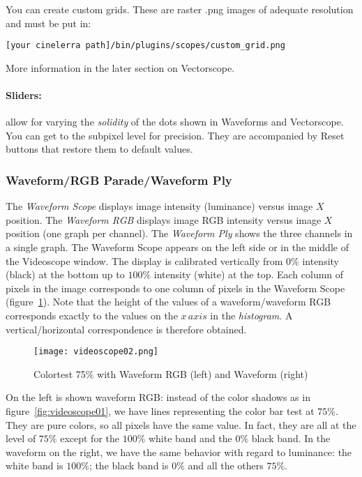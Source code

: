 You can create custom grids. These are raster .png images of adequate resolution and must be put in:

\begin{lstlisting}[style=sh]
[your cinelerra path]/bin/plugins/scopes/custom_grid.png
\end{lstlisting}

More information in the later section on Vectorscope.

\paragraph*{Sliders:} allow for varying the \textit{solidity} of the dots shown in Waveforms and Vectorscope. You can get to the subpixel level for precision. They are accompanied by Reset buttons that restore them to default values.



\subsubsection*{Waveform/RGB Parade/Waveform Ply}%
\label{ssub:waveform_rgb_parade_ply}

The \textit{Waveform Scope} displays image intensity (luminance) versus image $X$ position. The \textit{Waveform RGB} displays image RGB intensity versus image $X$ position (one graph per channel). The \textit{Waveform Ply} shows the three channels in a single graph. The Waveform Scope appears on the left side or in the middle of the Videoscope window. The display is calibrated vertically from $0\%$ intensity (black) at the bottom up to $100\%$ intensity (white) at the top. Each column of pixels in the image corresponds to one column of pixels in the Waveform Scope (figure~\ref{fig:videoscope02}). Note that the height of the values of a waveform/waveform RGB corresponds exactly to the values on the $x\, axis$ in the \textit{histogram}. A vertical/horizontal correspondence is therefore obtained.

\begin{figure}[hbtp]
    \centering
    \texttt{[image: videoscope02.png]}
    \caption{Colortest 75\% with Waveform RGB (left) and Waveform (right)}
    \label{fig:videoscope02}
\end{figure}

On the left is shown waveform RGB: instead of the color shadows as in figure~\ref{fig:videoscope01}, we have lines representing the color bar test at $75\%$. They are pure colors, so all pixels have the same value. In fact, they are all at the level of $75\%$ except for the $100\%$ white band and the $0\%$ black band. In the waveform on the right, we have the same behavior with regard to luminance: the white band is $100\%$; the black band is $0\%$ and all the others $75\%$.

